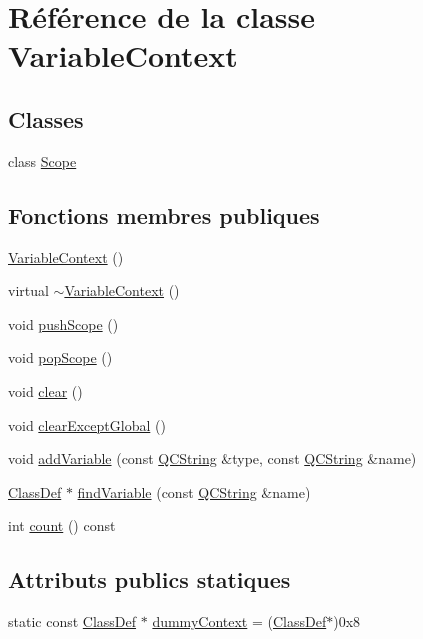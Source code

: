 \hypertarget{class_variable_context}{}\section{Référence de la classe Variable\+Context}
\label{class_variable_context}
\subsection*{Classes}
\begin{DoxyCompactItemize}
\item 
class \hyperlink{class_variable_context_1_1_scope}{Scope}
\end{DoxyCompactItemize}
\subsection*{Fonctions membres publiques}
\begin{DoxyCompactItemize}
\item 
\hyperlink{class_variable_context_a7828c91508ad684cd467e6733283466d}{Variable\+Context} ()
\item 
virtual \hyperlink{class_variable_context_af00c9313effa735675ffadfb6194abb3}{$\sim$\+Variable\+Context} ()
\item 
void \hyperlink{class_variable_context_ae1d858d3ad4778e79ac69a021474edab}{push\+Scope} ()
\item 
void \hyperlink{class_variable_context_a648ebfb9146a61b70dffe684aec77940}{pop\+Scope} ()
\item 
void \hyperlink{class_variable_context_a37579e37d7d730884861f71a1b9f0439}{clear} ()
\item 
void \hyperlink{class_variable_context_af762830da74924aa08900310e554e253}{clear\+Except\+Global} ()
\item 
void \hyperlink{class_variable_context_a290a97ba9049c9c00c2a9fcef5f12083}{add\+Variable} (const \hyperlink{class_q_c_string}{Q\+C\+String} \&type, const \hyperlink{class_q_c_string}{Q\+C\+String} \&name)
\item 
\hyperlink{class_class_def}{Class\+Def} $\ast$ \hyperlink{class_variable_context_ac6643c9a7fbfa30d341efe5c62c862fb}{find\+Variable} (const \hyperlink{class_q_c_string}{Q\+C\+String} \&name)
\item 
int \hyperlink{class_variable_context_a93e482aacaff7e8e202cb98edc2cc9bb}{count} () const 
\end{DoxyCompactItemize}
\subsection*{Attributs publics statiques}
\begin{DoxyCompactItemize}
\item 
static const \hyperlink{class_class_def}{Class\+Def} $\ast$ \hyperlink{class_variable_context_aeca8de524f06142f5a49a0a8f87467b0}{dummy\+Context} = (\hyperlink{class_class_def}{Class\+Def}$\ast$)0x8
\end{DoxyCompactItemize}


